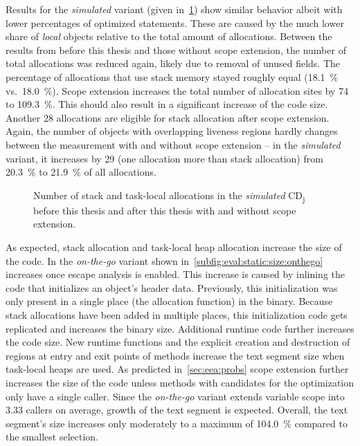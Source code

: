 		Results for the \emph{simulated} variant (given in~\cref{fig:eval:static:numallocs:simulated}) show similar behavior
		albeit with lower percentages of optimized statements. These are caused by the much lower share of \emph{local}
		objects relative to the total amount of allocations. Between the results from before this thesis and those without
		scope extension, the number of total allocations was reduced again, likely due to removal of unused fields. The
		percentage of allocations that use stack memory stayed roughly equal (18.1~\% vs.~18.0~\%). Scope extension
		increases the total number of allocation sites by 74 to 109.3~\%. This should also result in a significant increase
		of the code size. Another 28 allocations are eligible for stack allocation after scope extension. Again, the number
		of objects with overlapping liveness regions hardly changes between the measurement with and without scope extension
		– in the \emph{simulated} variant, it increases by 29 (one allocation more than stack allocation) from 20.3~\% to
		21.9~\% of all allocations.

		\begin{figure}
			\centering
			

			\caption[Number of stack and task-local allocations in \emph{simulated} CD\textsubscript{j}]{%
				Number of stack and task-local allocations in the \emph{simulated} CD\textsubscript{j} before this thesis and
				after this thesis with and without scope extension.}
			\label{fig:eval:static:numallocs:simulated}
		\end{figure}

		As expected, stack allocation and task-local heap allocation increase the size of the code. In the \emph{on-the-go}
		variant shown in~\cref{subfig:eval:static:size:onthego} increases once escape analysis is enabled. This increase is
		caused by inlining the code that initializes an object's header data. Previously, this initialization was only
		present in a single place (the allocation function) in the binary. Because stack allocations have been added in
		multiple places, this initialization code gets replicated and increases the binary size. Additional runtime code
		further increases the code size. New runtime functions and the explicit creation and destruction of regions at entry
		and exit points of methods increase the text segment size when task-local heaps are used. As predicted
		in~\cref{sec:eea:probs} scope extension further increases the size of the code unless methods with candidates for
		the optimization only have a single caller. Since the \emph{on-the-go} variant extends variable scope into 3.33
		callers on average, growth of the text segment is expected. Overall, the text segment's size increases only
		moderately to a maximum of 104.0~\% compared to the smallest selection.

